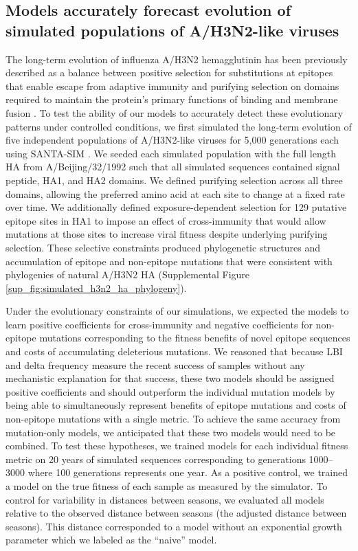 \subsection*{Models accurately forecast evolution of simulated populations of {A/H3N2-like viruses}}

The long-term evolution of influenza A/H3N2 hemagglutinin has been previously described as a balance between positive selection for substitutions at epitopes that enable escape from adaptive immunity and purifying selection on domains required to maintain the protein's primary functions of binding and membrane fusion \cite{Bush:1999vj,Neher2013,Luksza:2014hj,Koelle:2015dh}.
To test the ability of our models to accurately detect these evolutionary patterns under controlled conditions, we first simulated the long-term evolution of five independent populations of A/H3N2-like viruses for 5,000 generations each using SANTA-SIM \cite{Jariani2019}.
We seeded each simulated population with the full length HA from A/Beijing/32/1992 such that all simulated sequences contained signal peptide, HA1, and HA2 domains.
We defined purifying selection across all three domains, allowing the preferred amino acid at each site to change at a fixed rate over time.
We additionally defined exposure-dependent selection for 129 putative epitope sites in HA1 \cite{Wolf:2006da} to impose an effect of cross-immunity that would allow mutations at those sites to increase viral fitness despite underlying purifying selection.
These selective constraints produced phylogenetic structures and accumulation of epitope and non-epitope mutations that were consistent with phylogenies of natural A/H3N2 HA (Supplemental Figure \ref{sup_fig:simulated_h3n2_ha_phylogeny}).

Under the evolutionary constraints of our simulations, we expected the models to learn positive coefficients for cross-immunity and negative coefficients for non-epitope mutations corresponding to the fitness benefits of novel epitope sequences and costs of accumulating deleterious mutations.
We reasoned that because LBI and delta frequency measure the recent success of samples without any mechanistic explanation for that success, these two models should be assigned positive coefficients and should outperform the individual mutation models by being able to simultaneously represent benefits of epitope mutations and costs of non-epitope mutations with a single metric.
To achieve the same accuracy from mutation-only models, we anticipated that these two models would need to be combined.
To test these hypotheses, we trained models for each individual fitness metric on 20 years of simulated sequences corresponding to generations 1000--3000 where 100 generations represents one year.
As a positive control, we trained a model on the true fitness of each sample as measured by the simulator.
To control for variability in distances between seasons, we evaluated all models relative to the observed distance between seasons (the adjusted distance between seasons).
This distance corresponded to a model without an exponential growth parameter which we labeled as the ``naive'' model.

